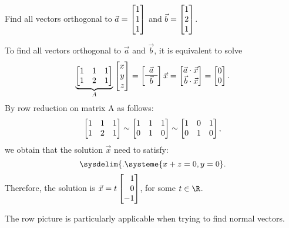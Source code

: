 \begin{example}
	Find all vectors orthogonal to $\vec a=\mat{1\\1\\1}$ and $\vec b=\mat{1\\2\\1}$.

	To find all vectors orthogonal to $\vec a$ and $\vec b$, it is equivalent to solve
	\[
	\underbrace{\mat{1&1&1\\1&2&1}}_A\mat{x\\y\\z}=
	\left[\begin{array}{c}\vec a\\\hline\vec b\end{array}\right]\vec x=
	\mat{\vec a\cdot \vec x\\\vec b\cdot\vec x}
	     =\mat{0\\0}.
    \]
    By row reduction on matrix A as follows:
    \[
        \mat{1&1&1\\1&2&1} \sim \mat{1&1&1\\0&1&0} \sim \mat{1&0&1\\0&1&0},
    \]
    we obtain that the solution $\vec x$ need to satisfy:
    \begin{equation}
	\sysdelim\{.
		\systeme{
			x+z=0,
			y=0
		}.
    \end{equation}
    Therefore, the solution is $\vec x = t\mat{1\\0\\-1}$, for some $t\in \R$.
	
\end{example}

The row picture is particularly applicable when trying to find normal vectors.

